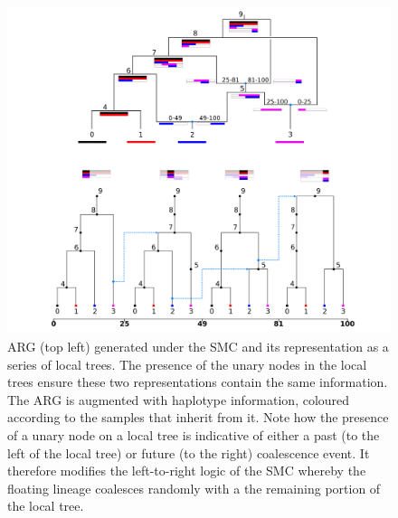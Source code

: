 \documentclass{article}
\begin{document}
\begin{figure}[!ht]
\centering
\includegraphics[width=\textwidth]{figures/smc_custom_2rows.png}
\caption{ARG (top left) generated under the SMC and its representation as a 
series of local trees. The presence of the unary nodes in the local trees 
ensure these two representations contain the same information. 
The ARG is augmented with haplotype information, coloured according to the 
samples that inherit from it. 
Note how the presence of a unary node on a local tree is 
indicative of either a past (to the left of the local tree) 
or future (to the right) coalescence event. It therefore modifies the 
left-to-right logic of the SMC whereby the floating lineage coalesces randomly
with a the remaining portion of the local tree. 
}
\label{fig:smc-unary}
\end{figure}

\end{document}
